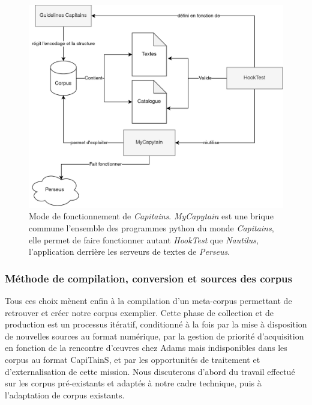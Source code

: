 \begin{figure}
    \centering
    \includegraphics[width=\textwidth]{figures/chap1/part2//capitains.png}
    \caption{Mode de fonctionnement de \textit{Capitains}. \textit{MyCapytain} est une brique commune  l'ensemble des programmes python du monde \textit{Capitains}, elle permet de faire fonctionner autant \textit{HookTest} que \textit{Nautilus}, l'application derrière les serveurs de textes de \textit{Perseus}.}
    \label{fig:chap1:Capitains}
\end{figure}




\subsubsection{Méthode de compilation, conversion et sources des corpus}

Tous ces choix mènent enfin à la compilation d'un meta-corpus permettant de retrouver et créer notre corpus exemplier. Cette phase de collection et de production est un processus itératif, conditionné à la fois par la mise à disposition de nouvelles sources au format numérique, par la gestion de priorité d'acquisition en fonction de la rencontre d'œuvres chez Adams mais indisponibles dans les corpus au format CapiTainS, et par les opportunités de traitement et d'externalisation de cette mission. Nous discuterons d'abord du travail effectué sur les corpus pré-existants et adaptés à notre cadre technique, puis à l'adaptation de corpus existants.

